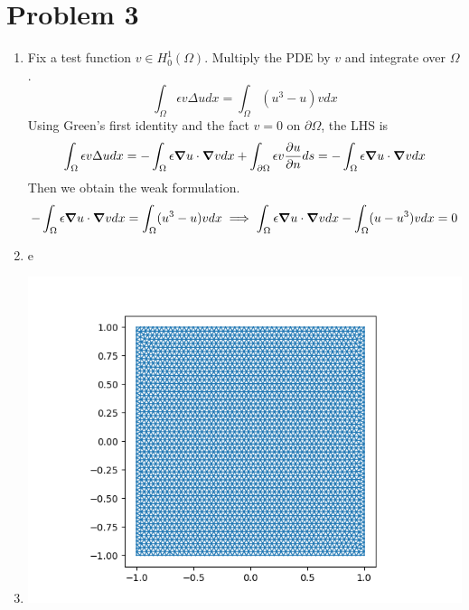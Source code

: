 \documentclass{article}
\newcommand{\ep}{\epsilon}
\newcommand{\imp}{\implies}
\newcommand{\ptl}{\partial}
\newcommand{\Om}{\Omega}
\begin{document}
\section*{Problem 3}

\begin{enumerate}[label=(\alph*)]
	
\item Fix a test function $v\in H_0^1(\Omega)$. Multiply the PDE by $v$ and integrate over $\Omega$.
$$\int_\Om \ep v\Delta udx = \int_\Om (u^3-u)vdx$$
Using Green's first identity and the fact $v=0$ on $\ptl\Om$, the LHS is
$$\int_\Om \ep v\Delta udx = -\int_\Om \ep\grad u\cdot\grad vdx + \int_{\ptl\Om} \ep v\pdv{u}{n}ds
= -\int_\Om \ep\grad u\cdot\grad vdx$$
Then we obtain the weak formulation.
$$-\int_\Om \ep\grad u\cdot\grad vdx = \int_\Om (u^3-u)vdx
\imp \int_\Om \ep\grad u\cdot\grad vdx - \int_\Om (u-u^3)vdx = 0$$


\item e


\item
\begin{center}
	\includegraphics[scale=.2]{FINAL q3 mesh}
\end{center}
\end{enumerate}
	
\end{document}
